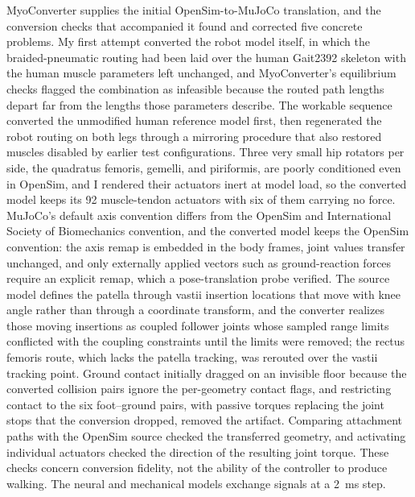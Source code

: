 MyoConverter supplies the initial OpenSim-to-MuJoCo translation, and the conversion checks that accompanied it found and corrected five concrete problems. My first attempt converted the robot model itself, in which the braided-pneumatic routing had been laid over the human Gait2392 skeleton with the human muscle parameters left unchanged, and MyoConverter's equilibrium checks flagged the combination as infeasible because the routed path lengths depart far from the lengths those parameters describe. The workable sequence converted the unmodified human reference model first, then regenerated the robot routing on both legs through a mirroring procedure that also restored muscles disabled by earlier test configurations. Three very small hip rotators per side, the quadratus femoris, gemelli, and piriformis, are poorly conditioned even in OpenSim, and I rendered their actuators inert at model load, so the converted model keeps its 92 muscle-tendon actuators with six of them carrying no force. MuJoCo's default axis convention differs from the OpenSim and International Society of Biomechanics convention, and the converted model keeps the OpenSim convention: the axis remap is embedded in the body frames, joint values transfer unchanged, and only externally applied vectors such as ground-reaction forces require an explicit remap, which a pose-translation probe verified. The source model defines the patella through vastii insertion locations that move with knee angle rather than through a coordinate transform, and the converter realizes those moving insertions as coupled follower joints whose sampled range limits conflicted with the coupling constraints until the limits were removed; the rectus femoris route, which lacks the patella tracking, was rerouted over the vastii tracking point. Ground contact initially dragged on an invisible floor because the converted collision pairs ignore the per-geometry contact flags, and restricting contact to the six foot--ground pairs, with passive torques replacing the joint stops that the conversion dropped, removed the artifact. Comparing attachment paths with the OpenSim source checked the transferred geometry, and activating individual actuators checked the direction of the resulting joint torque. These checks concern conversion fidelity, not the ability of the controller to produce walking. The neural and mechanical models exchange signals at a \qty{2}{\milli\second} step.
